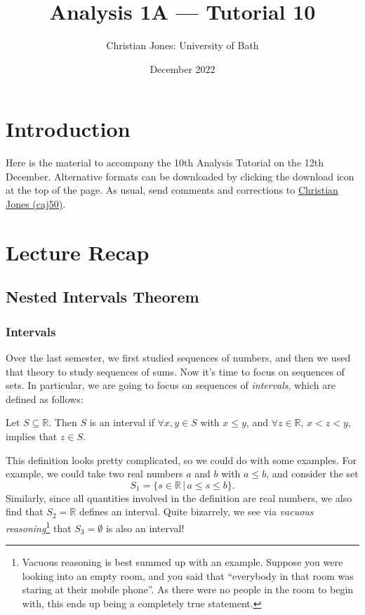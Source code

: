 \documentclass[
  17pt,
  a4paper]{extarticle}
\title{Analysis 1A --- Tutorial 10}
\author{Christian Jones: University of Bath}
\date{December 2022}
\theoremstyle{plain}
\theoremstyle{plain}
\theoremstyle{plain}
\theoremstyle{plain}
\theoremstyle{plain}
\theoremstyle{definition}
\theoremstyle{definition}
\theoremstyle{definition}
\theoremstyle{remark}
\let\BeginKnitrBlock\begin \let\EndKnitrBlock\end
\renewcommand{\;}{\,}
\begin{document}
\maketitle

{
\setcounter{tocdepth}{2}
\tableofcontents
}
\newpage
{}

\hypertarget{introduction}{%
\section*{Introduction}\label{introduction}}

Here is the material to accompany the 10th Analysis Tutorial on the 12th December. Alternative formats can be downloaded by clicking the download icon at the top of the page. As usual, send comments and corrections to \href{mailto:caj50@bath.ac.uk}{Christian Jones (caj50)}.

\hypertarget{lecture-recap}{%
\section{Lecture Recap}\label{lecture-recap}}

\hypertarget{nested-intervals-theorem}{%
\subsection{Nested Intervals Theorem}\label{nested-intervals-theorem}}

\hypertarget{intervals}{%
\subsubsection{Intervals}\label{intervals}}

Over the last semester, we first studied sequences of numbers, and then we used that theory to study sequences of sums. Now it's time to focus on sequences of sets. In particular, we are going to focus on sequences of \emph{intervals}, which are defined as follows:

\BeginKnitrBlock{definition}[Intervals]
{\label{def:def1} }Let \(S \subseteq \mathbb{R}\). Then \(S\) is an interval if \(\forall x,y \in S\) with \(x \leq y\), and \(\forall z \in \mathbb{R}\), \(x < z < y\), implies that \(z \in S\).
\EndKnitrBlock{definition}
This definition looks pretty complicated, so we could do with some examples. For example, we could take two real numbers \(a\) and \(b\) with \(a \leq b\), and consider the set \[S_1 = \lbrace s \in \mathbb{R}\; \lvert\; a \leq s \leq b \rbrace.\] Similarly, since all quantities involved in the definition are real numbers, we also find that \(S_2 = \mathbb{R}\) defines an interval. Quite bizarrely, we see via \emph{vacuous reasoning}\footnote{Vacuous reasoning is best summed up with an example. Suppose you were looking into an empty room, and you said that ``everybody in that room was staring at their mobile phone''. As there were no people in the room to begin with, this ends up being a completely true statement.} that \(S_3 = \emptyset\) is also an interval!
\end{document}
